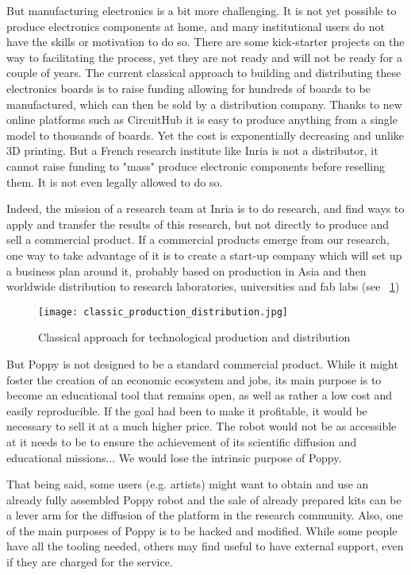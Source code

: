 But manufacturing electronics is a bit more challenging. It is not yet possible to produce electronics components at home, and many institutional users do not have the skills or motivation to do so. There are some kick-starter projects on the way to facilitating the process, yet they are not ready and will not be ready for a couple of years. The current classical approach to building and distributing these electronics boards is to raise funding allowing for hundreds of boards to be manufactured, which can then be sold by a distribution company. Thanks to new online platforms such as CircuitHub it is easy to produce anything from a single model to thousands of boards. Yet the cost is exponentially decreasing and unlike 3D printing. But a French research institute like Inria is not a distributor, it cannot raise funding to "mass" produce electronic components before reselling them. It is not even legally allowed to do so.

Indeed, the mission of a research team at Inria is to do research, and find ways to apply and transfer the results of this research, but not directly to produce and sell a commercial product. If a commercial products emerge from our research, one way to take advantage of it is to create a start-up company which will set up a business plan around it, probably based on production in Asia and then worldwide distribution to research laboratories, universities and fab labs (see \figurename~\ref{fig:classic})

\begin{figure}[tb]
    \begin{center}
        \texttt{[image: classic\_production\_distribution.jpg]}
    \end{center}
    \caption{Classical approach for technological production and distribution}
    \label{fig:classic}
\end{figure}

But Poppy is not designed to be a standard commercial product. While it might foster the creation of an economic ecosystem and jobs, its main purpose is to become an educational tool that remains open, as well as rather a low cost and easily reproducible. If the goal had been to make it profitable, it would be necessary to sell it at a much higher price. The robot would not be as accessible at it needs to be to ensure the achievement of its scientific diffusion and educational missions... We would lose the intrinsic purpose of Poppy.

That being said, some users (e.g. artists) might want to obtain and use an already fully assembled Poppy robot and the sale of already prepared kits can be a lever arm for the diffusion of the platform in the research community.
Also, one of the main purposes of Poppy is to be hacked and modified.  While some people have all the tooling needed, others may find useful to have external support, even if they are charged for the service.

